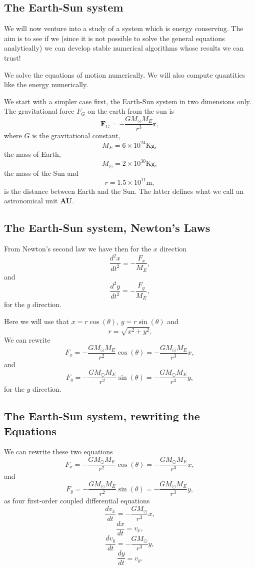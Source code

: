 \documentclass[%
oneside,                 %
final,                   %
10pt]{article}
\begin{document}
\subsection{The Earth-Sun system}

We will now venture into a study of a system which is energy
conserving. The aim is to see if we (since it is not possible to solve
the general equations analytically) we can develop stable numerical
algorithms whose results we can trust!

We solve the equations of motion numerically. We will also compute
quantities like the energy numerically.

We start with a simpler case first, the Earth-Sun system  in two dimensions only.  The gravitational force $F_G$ on the earth from the sun is  
\[
\bm{F}_G=-\frac{GM_{\odot}M_E}{r^3}\bm{r},
\]
where $G$ is the gravitational constant, 
\[
M_E=6\times 10^{24}\mathrm{Kg},
\]
the mass of Earth, 
\[
M_{\odot}=2\times 10^{30}\mathrm{Kg}, 
\]
the mass of the Sun and 
\[
r=1.5\times 10^{11}\mathrm{m}, 
\]
is the distance between Earth and the Sun. The latter defines what we call an astronomical unit \textbf{AU}.

\subsection{The Earth-Sun system, Newton's Laws}

From Newton's second law we have then for the $x$ direction
\[
\frac{d^2x}{dt^2}=-\frac{F_{x}}{M_E},
\]
and
\[
\frac{d^2y}{dt^2}=-\frac{F_{y}}{M_E},
\]
for the $y$ direction.

Here we will use  that  $x=r\cos{(\theta)}$, $y=r\sin{(\theta)}$ and
\[
r = \sqrt{x^2+y^2}.
\]
We can rewrite 
\[
F_{x}=-\frac{GM_{\odot}M_E}{r^2}\cos{(\theta)}=-\frac{GM_{\odot}M_E}{r^3}x,
\]
and
\[
F_{y}=-\frac{GM_{\odot}M_E}{r^2}\sin{(\theta)}=-\frac{GM_{\odot}M_E}{r^3}y,
\]
for the $y$ direction.

\subsection{The Earth-Sun system, rewriting the Equations}

We can rewrite these two equations
\[
F_{x}=-\frac{GM_{\odot}M_E}{r^2}\cos{(\theta)}=-\frac{GM_{\odot}M_E}{r^3}x,
\]
and
\[
F_{y}=-\frac{GM_{\odot}M_E}{r^2}\sin{(\theta)}=-\frac{GM_{\odot}M_E}{r^3}y,
\]
as four first-order coupled differential equations
\[
\frac{dv_x}{dt}=-\frac{GM_{\odot}}{r^3}x,
\]
\[
\frac{dx}{dt}=v_x,
\]
\[
\frac{dv_y}{dt}=-\frac{GM_{\odot}}{r^3}y,
\]
\[
\frac{dy}{dt}=v_y.
\]
\end{document}
